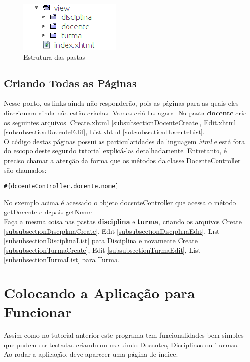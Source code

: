 \documentclass[12pt,a4paper]{article}
\begin{document}
\begin{figure}[!htb]
    \centering
    \includegraphics[scale=0.60]{pastas.png}
    \caption{Estrutura das pastas}
    \label{imagemEstruturaPastasView}
\end{figure}



\subsection{Criando Todas as Páginas}
Nesse ponto, os links ainda não responderão, pois as páginas para as quais eles direcionam ainda não estão criadas. Vamos criá-las agora. Na pasta \textbf{docente} crie os seguintes arquivos: Create.xhtml \ref{subsubsectionDocenteCreate}, Edit.xhtml \ref{subsubsectionDocenteEdit}, List.xhtml \ref{subsubsectionDocenteList}.\\
O código destas páginas possui as particularidades da linguagem \textit{html} e está fora do escopo deste segundo tutorial explicá-las detalhadamente. Entretanto, é preciso chamar a atenção da forma que os métodos da classe DocenteController são chamados:
\lstset{language=HTML}
\begin{lstlisting}
#{docenteController.docente.nome}
\end{lstlisting}
No exemplo acima é acessado o objeto docenteController que acessa o método getDocente e depois getNome.\\


Faça a mesma coisa nas pastas \textbf{disciplina} e \textbf{turma}, criando os arquivos Create \ref{subsubsectionDisciplinaCreate}, Edit \ref{subsubsectionDisciplinaEdit}, List \ref{subsubsectionDisciplinaList} para Disciplina e novamente Create \ref{subsubsectionTurmaCreate}, Edit \ref{subsubsectionTurmaEdit}, List \ref{subsubsectionTurmaList} para Turma.

\newpage
\section{Colocando a Aplicação para Funcionar}
Assim como no tutorial anterior este programa tem funcionalidades bem simples que podem ser testadas criando ou excluindo Docentes, Disciplinas ou Turmas. Ao rodar a aplicação, deve aparecer uma página de índice.
\end{document}
